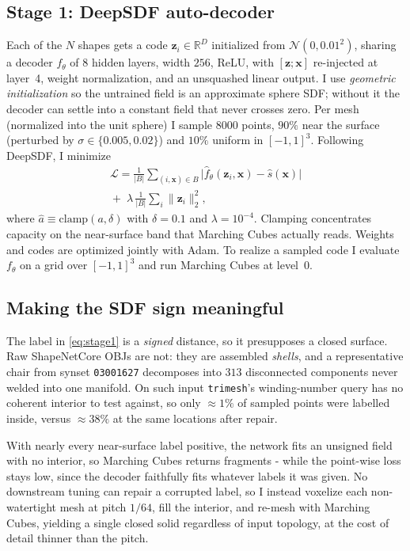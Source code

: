 \documentclass[11pt]{article}
\begin{document}
\subsection{Stage 1: DeepSDF auto-decoder}
Each of the $N$ shapes gets a code $\mathbf{z}_i \in \mathbb{R}^D$ initialized
from $\mathcal{N}(0,0.01^2)$, sharing a decoder $f_\theta$ of $8$ hidden layers,
width $256$, ReLU, with $[\mathbf{z};\mathbf{x}]$ re-injected at layer~4, weight
normalization, and an unsquashed linear output. I use \emph{geometric
initialization} \citep{atzmon2020sal, gropp2020igr} so the untrained field is an
approximate sphere SDF; without it the decoder can settle into a constant field
that never crosses zero. Per mesh (normalized into the unit sphere) I sample
$8000$ points, $90\%$ near the surface (perturbed by $\sigma\in\{0.005,0.02\}$)
and $10\%$ uniform in $[-1,1]^3$. Following DeepSDF, I minimize
\begin{equation}
\label{eq:stage1}
\begin{split}
\mathcal{L} = \frac{1}{|B|}\sum_{(i,\mathbf{x})\in B}
  \bigl| \hat{f}_\theta(\mathbf{z}_i, \mathbf{x}) - \hat{s}(\mathbf{x}) \bigr| \\
  {}+\; \lambda \, \frac{1}{|B|}\sum_i \lVert \mathbf{z}_i \rVert_2^2 ,
\end{split}
\end{equation}
where $\hat{a} \equiv \mathrm{clamp}(a,\delta)$ with $\delta=0.1$ and
$\lambda=10^{-4}$. Clamping concentrates capacity on the near-surface band that
Marching Cubes actually reads. Weights and codes are optimized jointly with Adam.
To realize a sampled code I evaluate $f_\theta$ on a grid over $[-1,1]^3$ and
run Marching Cubes at level~0.

\subsection{Making the SDF sign meaningful}
\label{sec:watertight}
The label in \cref{eq:stage1} is a \emph{signed} distance, so it presupposes a
closed surface. Raw ShapeNetCore OBJs are not: they are assembled \emph{shells},
and a representative chair from synset \texttt{03001627} decomposes into $313$
disconnected components never welded into one manifold. On such input
\texttt{trimesh}'s winding-number query has no coherent interior to test
against, so only ${\approx}1\%$ of sampled points were labelled inside, versus
${\approx}38\%$ at the same locations after repair.

With nearly every near-surface label positive, the network fits an unsigned
field with no interior, so Marching Cubes returns fragments - while the
point-wise loss stays low, since the decoder faithfully fits whatever labels it
was given. No downstream tuning can repair a corrupted label, so I instead
voxelize each non-watertight mesh at pitch $1/64$, fill the interior, and
re-mesh with Marching Cubes, yielding a single closed solid regardless of input
topology, at the cost of detail thinner than the pitch.
\end{document}

